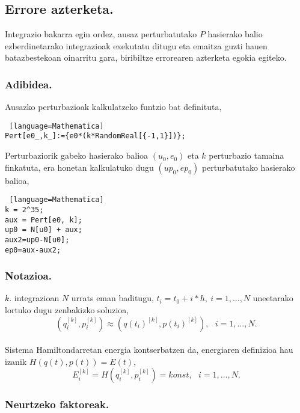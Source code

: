 \subsection{Errore azterketa.}

Integrazio bakarra egin ordez, ausaz perturbatutako $P$ hasierako balio ezberdinetarako integrazioak exekutatu ditugu eta emaitza guzti hauen batazbestekoan oinarritu gara, biribiltze errorearen azterketa egokia egiteko.    

\subsubsection*{Adibidea.}

Ausazko perturbazioak kalkulatzeko funtzio bat definituta,
\begin{lstlisting} [language=Mathematica]
Pert[e0_,k_]:={e0*(k*RandomReal[{-1,1}])};
\end{lstlisting}

Perturbaziorik gabeko hasierako balioa $(u_0,e_0)$ eta $k$ perturbazio tamaina finkatuta, era honetan kalkulatuko dugu $(up_0,ep_0)$ perturbatutako hasierako balioa,
\begin{lstlisting} [language=Mathematica]
k = 2^35;
aux = Pert[e0, k];
up0 = N[u0] + aux;
aux2=up0-N[u0];
ep0=aux-aux2;
\end{lstlisting}


\subsubsection*{Notazioa.}  

$k$. integrazioan $N$ urrats eman baditugu, $t_i=t_0+i*h, \ i=1,\dots,N$ uneetarako lortuko dugu 
zenbakizko soluzioa,
\begin{equation*}
(q_i^{[k]},p_i^{[k]})\approx(q(t_i)^{[k]},p(t_i)^{[k]}), \ \ \ i=1,\dots,N.
\end{equation*}

\paragraph*{}Sistema Hamiltondarretan energia kontserbatzen da, energiaren definizioa hau izanik $H(q(t),p(t))=E(t)$,
\begin{equation*}
E_i^{[k]}=H(q_i^{[k]},p_i^{[k]})=konst, \ \ \ i=1,\dots,N.
\end{equation*}

\subsubsection*{Neurtzeko faktoreak.}

